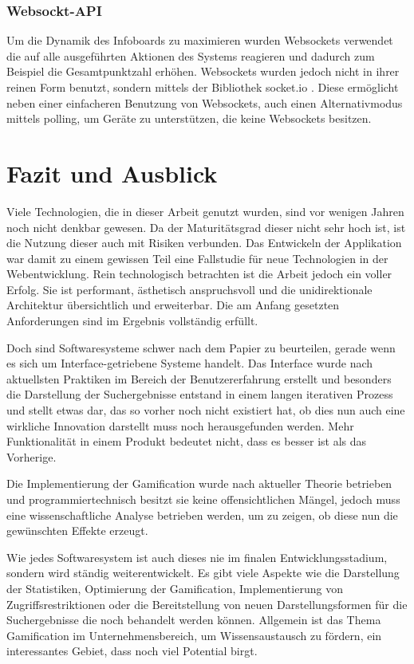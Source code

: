 \documentclass[12pt,twoside]{book}
\begin{document}
\subsection{Websockt-API}

Um die Dynamik des Infoboards zu maximieren wurden Websockets verwendet die auf alle ausgeführten Aktionen des Systems reagieren und dadurch zum Beispiel die Gesamtpunktzahl erhöhen. Websockets wurden jedoch nicht in ihrer reinen Form benutzt, sondern mittels der Bibliothek socket.io \cite{rauch2013socket}. Diese ermöglicht neben einer einfacheren Benutzung von Websockets, auch einen Alternativmodus mittels polling, um Geräte zu unterstützen, die keine Websockets besitzen.


\chapter{Fazit und Ausblick}

Viele Technologien, die in dieser Arbeit genutzt wurden, sind vor wenigen Jahren noch nicht denkbar gewesen. Da der Maturitätsgrad dieser nicht sehr hoch ist, ist die Nutzung dieser auch mit Risiken verbunden. Das Entwickeln der Applikation war damit zu einem gewissen Teil eine Fallstudie für neue Technologien in der Webentwicklung.
Rein technologisch betrachten ist die Arbeit jedoch ein voller Erfolg. Sie ist performant, ästhetisch anspruchsvoll und die unidirektionale Architektur übersichtlich und erweiterbar.
Die am Anfang gesetzten Anforderungen sind im Ergebnis vollständig erfüllt.

Doch sind Softwaresysteme schwer nach dem Papier zu beurteilen, gerade wenn es sich um Interface-getriebene Systeme handelt. Das Interface wurde nach aktuellsten Praktiken im Bereich der Benutzererfahrung erstellt und besonders die Darstellung der Suchergebnisse entstand in einem langen iterativen Prozess und stellt etwas dar, das so vorher noch nicht existiert hat, ob dies nun auch eine wirkliche Innovation darstellt muss noch herausgefunden werden. Mehr Funktionalität in einem Produkt bedeutet nicht, dass es besser ist als das Vorherige.

Die Implementierung der Gamification wurde nach aktueller Theorie betrieben und programmiertechnisch besitzt sie keine offensichtlichen Mängel, jedoch muss eine wissenschaftliche Analyse betrieben werden, um zu zeigen, ob diese nun die gewünschten Effekte erzeugt.

Wie jedes Softwaresystem ist auch dieses nie im finalen Entwicklungsstadium, sondern wird ständig weiterentwickelt. Es gibt viele Aspekte wie die Darstellung der Statistiken, Optimierung der Gamification, Implementierung von Zugriffsrestriktionen oder  die Bereitstellung von neuen Darstellungsformen für die Suchergebnisse die noch behandelt werden können. Allgemein ist das Thema Gamification im Unternehmensbereich, um Wissensaustausch zu fördern, ein interessantes Gebiet, dass noch viel Potential birgt.
\end{document}
